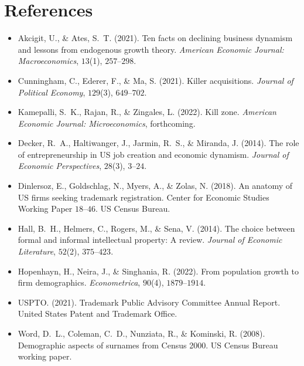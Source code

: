 \documentclass[11pt]{article}
\begin{document}
\section*{References}
\begin{itemize}\setlength\itemsep{2pt}
\item Akcigit, U., \& Ates, S.~T. (2021). Ten facts on declining
  business dynamism and lessons from endogenous growth theory.
  \emph{American Economic Journal: Macroeconomics}, $13$(1), $257$--$298$.
\item Cunningham, C., Ederer, F., \& Ma, S. (2021). Killer
  acquisitions. \emph{Journal of Political Economy}, $129$(3),
  $649$--$702$.
\item Kamepalli, S.~K., Rajan, R., \& Zingales, L. (2022). Kill
  zone. \emph{American Economic Journal: Microeconomics},
  forthcoming.
\item Decker, R.~A., Haltiwanger, J., Jarmin, R.~S., \& Miranda, J.
  (2014). The role of entrepreneurship in US job creation and
  economic dynamism. \emph{Journal of Economic Perspectives},
  $28$(3), $3$--$24$.
\item Dinlersoz, E., Goldschlag, N., Myers, A., \& Zolas, N. (2018).
  An anatomy of US firms seeking trademark registration. Center for
  Economic Studies Working Paper $18$--$46$. US Census Bureau.
\item Hall, B.~H., Helmers, C., Rogers, M., \& Sena, V. (2014). The
  choice between formal and informal intellectual property: A review.
  \emph{Journal of Economic Literature}, $52$(2), $375$--$423$.
\item Hopenhayn, H., Neira, J., \& Singhania, R. (2022). From
  population growth to firm demographics. \emph{Econometrica},
  $90$(4), $1879$--$1914$.
\item USPTO. (2021). Trademark Public Advisory Committee Annual
  Report. United States Patent and Trademark Office.
\item Word, D.~L., Coleman, C.~D., Nunziata, R., \& Kominski, R.
  (2008). Demographic aspects of surnames from Census 2000. US
  Census Bureau working paper.
\end{itemize}
\end{document}
